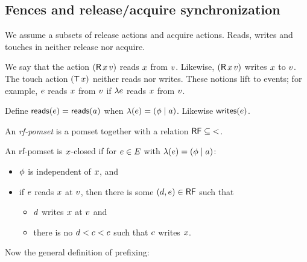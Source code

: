 \subsection{Fences and release/acquire synchronization}

We assume a subsets of release actions %
and acquire actions. %
Reads, writes and touches in neither release nor acquire.

We say that the action $(\mathsf{R}\,x\,v)$ reads $x$ from $v$.
Likewise, $(\mathsf{R}\,x\,v)$ writes $x$ to $v$.  The touch action
$(\mathsf{T}\,x)$ neither reads nor writes.  These notions lift to events; for example, $e$
reads $x$ from $v$ if $\lambda{e}$ reads $x$ from $v$.

Define $\mathsf{reads}(e) = \mathsf{reads}(a)$ when $\lambda(e) = (\phi \mid a)$.
Likewise $\mathsf{writes}(e)$.
\begin{definition}
  An \emph{rf-pomset} is a pomset together with a relation
  $\mathord{\mathsf{RF}} \subseteq \mathord{<}$.
\end{definition}
\begin{definition}
  An rf-pomset is $x$-closed if
  for $e\in E$ with $\lambda(e)=(\phi \mid a)$:
  \begin{itemize}
  \item $\phi$ is independent of $x$, and
  \item if $e$ reads $x$ at $v$, then there is some
    $(d,e) \in \mathsf{RF}$ such that
    \begin{itemize}
    \item $d$ writes $x$ at $v$ and
    \item there is no $d < c < e$ such that $c$ writes $x$.
    \end{itemize}
  \end{itemize}
\end{definition}

Now the general definition of prefixing:

